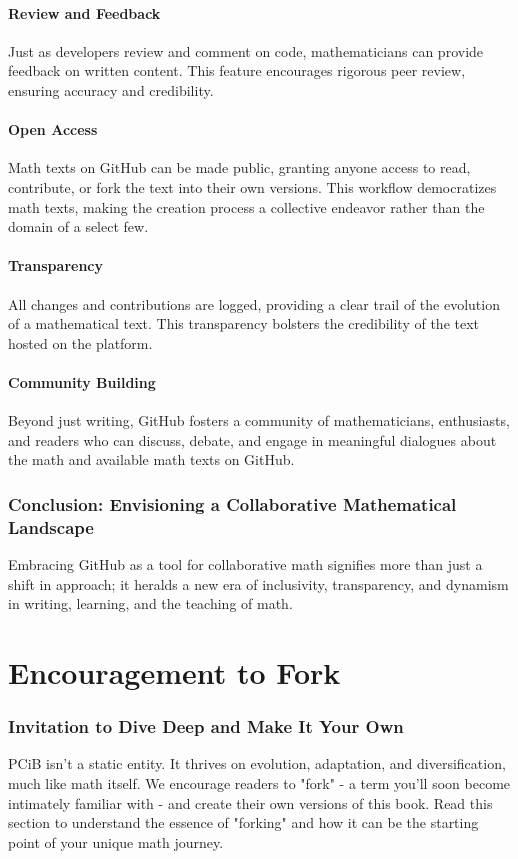 \documentclass[a4paper,12pt]{book}
\begin{document}
\subsubsection*{Review and Feedback}
Just as developers review and comment on code, mathematicians can provide feedback on written content. This feature encourages rigorous peer review, ensuring accuracy and credibility.

\subsubsection*{Open Access}
Math texts on GitHub can be made public, granting anyone access to read, contribute, or fork the text into their own versions. This workflow democratizes math texts, making the creation process a collective endeavor rather than the domain of a select few.

\subsubsection*{Transparency}
All changes and contributions are logged, providing a clear trail of the evolution of a mathematical text. This transparency bolsters the credibility of the text hosted on the platform.

\subsubsection*{Community Building}
Beyond just writing, GitHub fosters a community of mathematicians, enthusiasts, and readers who can discuss, debate, and engage in meaningful dialogues about the math and available math texts on GitHub.

\subsection*{Conclusion: Envisioning a Collaborative Mathematical Landscape}
Embracing GitHub as a tool for collaborative math signifies more than just a shift in approach; it heralds a new era of inclusivity, transparency, and dynamism in writing, learning, and the teaching of math. 

\chapter{Encouragement to Fork}
\subsection*{Invitation to Dive Deep and Make It Your Own}
PCiB isn't a static entity. It thrives on evolution, adaptation, and diversification, much like math itself. We encourage readers to "fork" - a term you'll soon become intimately familiar with - and create their own versions of this book. Read this section to understand the essence of "forking" and how it can be the starting point of your unique math journey.
\end{document}
